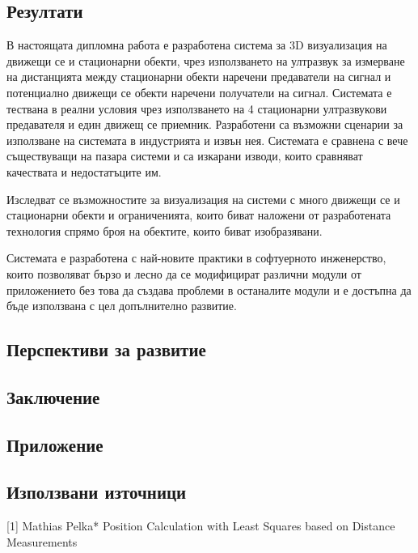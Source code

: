 \subsection{Резултати}

В настоящата дипломна работа е разработена система за 3D визуализация на движещи се и стационарни обекти, чрез използването на ултразвук за измерване на дистанцията между стационарни обекти наречени предаватели на сигнал и потенциално движещи се обекти наречени получатели на сигнал. Системата е тествана в реални условия чрез използването на 4 стационарни ултразвукови предавателя и един движещ се приемник. Разработени са възможни сценарии за използване на системата в индустрията и извън нея. Системата е сравнена с вече съществуващи на пазара системи и са изкарани изводи, които сравняват качествата и недостатъците им.

Изследват се възможностите за визуализация на системи с много движещи се и стационарни обекти и ограниченията, които биват наложени от разработената технология спрямо броя на обектите, които биват изобразявани.

Системата е разработена с най-новите практики в софтуерното инженерство, които позволяват бързо и лесно да се модифицират различни модули от приложението без това да създава проблеми в останалите модули и е достъпна да бъде използвана с цел допълнително развитие.

\subsection{Перспективи за развитие}

\subsection{Заключение}

\subsection{Приложение}

\subsection{Използвани източници}
[1] Mathias Pelka* Position Calculation with Least Squares based on Distance Measurements